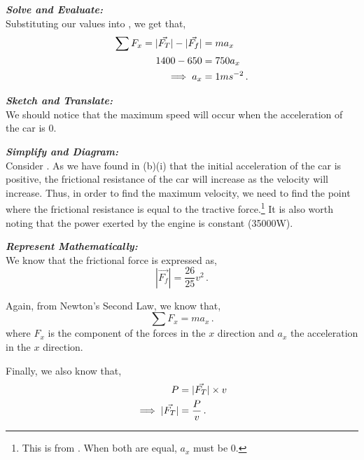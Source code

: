 \begin{subquestions}
\begin{subsubquestions}
\textbf{\textit{Solve and Evaluate:}} \\
Substituting our values into , we get that,
\begin{align}
	\sum F_x = |\vec{F_T}|-|\vec{F_f}| & = ma_x \nonumber \\
	           1400 - 650 & = 750a_x \nonumber \\
	           \implies a_x & = 1 ms^{-2} \,.
\end{align}


\subsubquestion
\textbf{\textit{Sketch and Translate:}} \\
We should notice that the maximum speed will occur when the acceleration of the car is 0.




\textbf{\textit{Simplify and Diagram:}} \\
Consider . As we have found in (b)(i) that the initial acceleration of the car is positive, the frictional resistance of the car will increase as the velocity will increase. Thus, in order to find the maximum velocity, we need to find the point where the frictional resistance is equal to the tractive force.\footnote{This is from . When both are equal, $a_x$ must be 0.} It is also worth noting that the power exerted by the engine is constant (35000W).




\textbf{\textit{Represent Mathematically:}} \\
We know that the frictional force is expressed as,
\begin{equation}
	|\vec{F_f}| = \frac{26}{25}v^2 \,.
\end{equation}

Again, from Newton's Second Law, we know that,
\begin{equation}
	\sum F_x = ma_x \label{2009:q5:FxEqn3} \,.
\end{equation}
where $F_x$ is the component of the forces in the $x$ direction and $a_x$ the acceleration in the $x$ direction.

Finally, we also know that, 
\begin{align}
	P & = |\vec{F_T}|\times v \label{2009:q5:PEqn2} \nonumber \\
	\implies |\vec{F_T}| & = \frac{P}{v} \,. 
\end{align}
	




\end{subsubquestions}
\end{subquestions}
